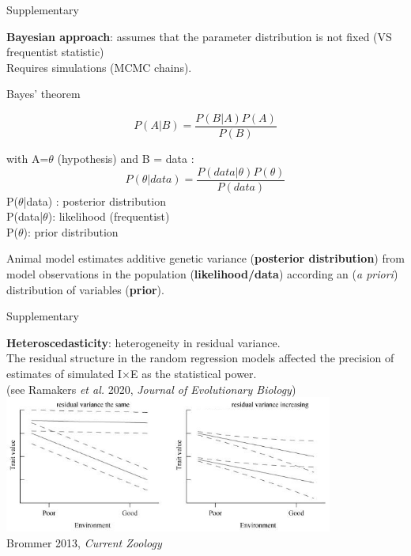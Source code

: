 \documentclass[compress]{beamer}
\begin{document}
\begin{frame}{Supplementary}


\textbf{Bayesian approach}: assumes that the parameter distribution is not fixed (VS frequentist statistic) \\
Requires simulations (MCMC chains).
\begin{exampleblock}{Bayes' theorem}

\[ P(A|B) =  \frac{P(B|A) P(A)}{P(B)} \]

\scriptsize
with A=$\theta$ (hypothesis) and B = data : \\
\normalsize
\[ P(\theta|data) =  \frac{P(data|\theta) P(\theta)}{P(data)} \]
\scriptsize
P($\theta$|data) : posterior distribution \\
P(data|$\theta$): likelihood (frequentist) \\
P($\theta$): prior distribution \\

\end{exampleblock}

Animal model estimates additive genetic variance (\textbf{posterior distribution}) from model observations in the population (\textbf{likelihood/data}) according an (\textit{a priori}) distribution of variables (\textbf{prior}).

\addtocounter{framenumber}{-1}
 \end{frame}

 

\begin{frame}{Supplementary}
\addtocounter{framenumber}{-1}


\textbf{Heteroscedasticity}: heterogeneity in residual variance. \\The residual structure in the random regression models affected the precision of estimates of simulated I$\times$E as the statistical power.\\
\scriptsize{(see Ramakers \textit{et al.} 2020, \textit{Journal of Evolutionary Biology})}
\\

\vspace{0.5cm}
\includegraphics[height = 4.5cm]{Image/Illustration/Brommer 2013.JPG} \\
\raggedleft\vspace{0.3cm}
 \tiny{Brommer 2013, \textit{Current Zoology}} 



 \end{frame}

 
\end{document}
